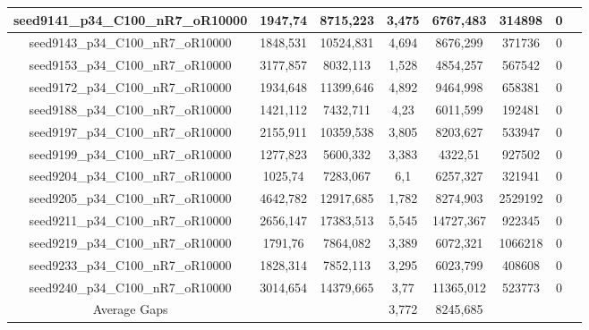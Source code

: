 \documentclass[a4paper]{article}
\begin{document}
\begin{center}
\begin{longtable}{cccccccc}
\hline
seed9141\_p34\_C100\_nR7\_oR10000 & 1947,74 & 8715,223 & 3,475 & 6767,483 & 314898 & 0\\
\hline
seed9143\_p34\_C100\_nR7\_oR10000 & 1848,531 & 10524,831 & 4,694 & 8676,299 & 371736 & 0\\
\hline
seed9153\_p34\_C100\_nR7\_oR10000 & 3177,857 & 8032,113 & 1,528 & 4854,257 & 567542 & 0\\
\hline
seed9172\_p34\_C100\_nR7\_oR10000 & 1934,648 & 11399,646 & 4,892 & 9464,998 & 658381 & 0\\
\hline
seed9188\_p34\_C100\_nR7\_oR10000 & 1421,112 & 7432,711 & 4,23 & 6011,599 & 192481 & 0\\
\hline
seed9197\_p34\_C100\_nR7\_oR10000 & 2155,911 & 10359,538 & 3,805 & 8203,627 & 533947 & 0\\
\hline
seed9199\_p34\_C100\_nR7\_oR10000 & 1277,823 & 5600,332 & 3,383 & 4322,51 & 927502 & 0\\
\hline
seed9204\_p34\_C100\_nR7\_oR10000 & 1025,74 & 7283,067 & 6,1 & 6257,327 & 321941 & 0\\
\hline
seed9205\_p34\_C100\_nR7\_oR10000 & 4642,782 & 12917,685 & 1,782 & 8274,903 & 2529192 & 0\\
\hline
seed9211\_p34\_C100\_nR7\_oR10000 & 2656,147 & 17383,513 & 5,545 & 14727,367 & 922345 & 0\\
\hline
seed9219\_p34\_C100\_nR7\_oR10000 & 1791,76 & 7864,082 & 3,389 & 6072,321 & 1066218 & 0\\
\hline
seed9233\_p34\_C100\_nR7\_oR10000 & 1828,314 & 7852,113 & 3,295 & 6023,799 & 408608 & 0\\
\hline
seed9240\_p34\_C100\_nR7\_oR10000 & 3014,654 & 14379,665 & 3,77 & 11365,012 & 523773 & 0\\
\hline
\hline
Average Gaps & & & 3,772 & 8245,685 & & \\
\hline
\hline
\end{longtable}
\end{center}
\end{document}
